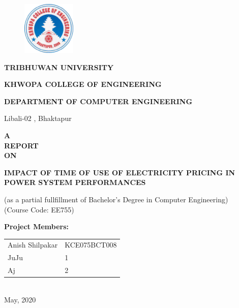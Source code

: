 \documentclass[12pt]{report}
\begin{document}
\begin{titlepage}
\begin{figure}[H]
\centering
\includegraphics[width=1in,height=1in]{khwopa.png}
\end{figure}

\begin{center}
\textbf{TRIBHUWAN UNIVERSITY}\\
\begin{LARGE}
\textbf{KHWOPA COLLEGE OF ENGINEERING}\\
\end{LARGE}
\begin{large}
\textbf{DEPARTMENT OF COMPUTER ENGINEERING}\\
\end{large}
\bigskip
Libali-02 , Bhaktapur\\

\vspace{2.54cm}

\textbf{A\\
REPORT\\
ON\\}
\begin{LARGE}
\textbf{IMPACT OF TIME OF USE OF ELECTRICITY PRICING IN POWER SYSTEM PERFORMANCES}\\
\end{LARGE}
\onehalfspacing
(as a partial fullfillment of Bachelor's Degree in Computer Engineering)\\
(Course Code: EE755)

\vspace{2.54cm}
\textbf{Project Members:}\\
\begin{tabular}{ll}
Anish Shilpakar & KCE075BCT008\\
JuJu & 1\\
Aj & 2\\
\end{tabular}\\

\vspace{2.54cm}
May, 2020
\end{center}
\end{titlepage}
\pagebreak

\end{document}
